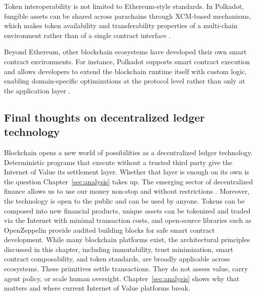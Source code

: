 Token interoperability is not limited to Ethereum-style standards. In Polkadot,
fungible assets can be shared across parachains through XCM-based mechanisms,
which makes token availability and transferability properties of a multi-chain
environment rather than of a single contract interface \cite{Morhac2022fungible}.



Beyond Ethereum, other blockchain ecosystems have developed their own smart contract environments. For instance, Polkadot supports smart contract execution and allows developers to extend the blockchain runtime itself with custom logic, enabling domain-specific optimizations at the protocol level rather than only at the application layer \cite{Wood2017}.

\subsection{Final thoughts on decentralized ledger technology}

Blockchain opens a new world of possibilities as a decentralized ledger technology.
Deterministic programs that execute without a trusted third party give the Internet of Value its settlement layer. Whether that layer is enough on its own is the question Chapter~\ref{sec:analysis} takes up.
The emerging sector of decentralized finance allows us to use our money non-stop and without restrictions \cite{Jensen2021, Schar2021, Zetzsche2020}. Moreover, the technology is open to the public and can be used by anyone. Tokens can be composed into new financial products, unique assets can be tokenized and traded via the Internet with minimal transaction costs, and open-source libraries such as OpenZeppelin provide audited building blocks for safe smart contract development.
While many blockchain platforms exist, the architectural principles discussed in this chapter, including immutability, trust minimization, smart contract composability, and token standards, are broadly applicable across ecosystems.
These primitives settle transactions. They do not assess value, carry agent policy, or scale human oversight. Chapter~\ref{sec:analysis} shows why that matters and where current Internet of Value platforms break.
